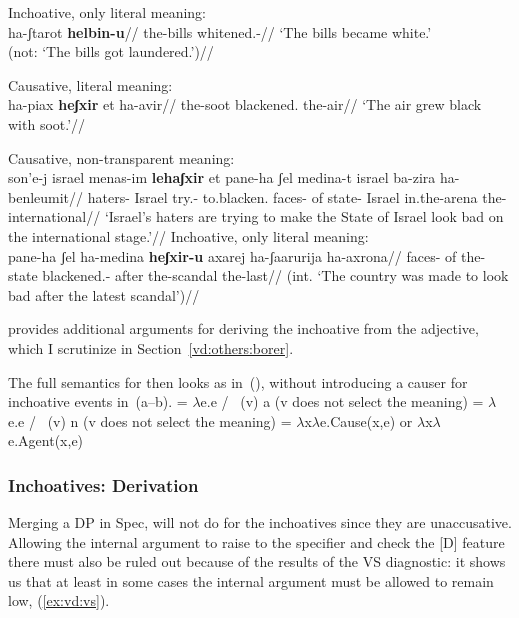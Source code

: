 	\a Inchoative, only literal meaning:\\
		\begingl
			\gla ha-ʃtarot \textbf{helbin-u}//
			\glb the-bills whitened.-//
			\glft `The bills became white.'\\
				(not: `The bills got laundered.')//
		\endgl
\xe

\pex
	\a Causative, literal meaning:\\
		\begingl
			\gla ha-piax \textbf{heʃxir} et ha-avir//
			\glb the-soot blackened.  the-air//
			\glft `The air grew black with soot.'//
		\endgl
	
	\a Causative, non-transparent meaning:\\
		\begingl
			\gla son'e-j israel menas-im \textbf{lehaʃxir} et pane-ha ʃel medina-t israel ba-zira ha-benleumit//
			\glb haters- Israel try.- to.blacken.  faces- of state- Israel in.the-arena the-international//
			\glft `Israel's haters are trying to make the State of Israel look bad on the international stage.'//
		\endgl
	\a Inchoative, only literal meaning:\\
		\begingl
			\gla{}pane-ha ʃel ha-medina \textbf{heʃxir-u} axarej ha-ʃaarurija ha-axrona//
			\glb faces- of the-state blackened.- after the-scandal the-last//
			\glft (int. `The country was made to look bad after the latest scandal')//
		\endgl
\xe


\cite{borer91} provides additional arguments for deriving the inchoative from the adjective, which I scrutinize in Section~\ref{vd:others:borer}.

The full semantics for {\vd} then looks as in~(\nextx), without introducing a causer for inchoative events in~(\nextx a--b).
\pex\label{ex:vd:sem-full}
	\a \denote{\vd} = $\lambda$e.e / \trace~(v) a \hfill (v does not select the meaning)
	\a \denote{\vd} = $\lambda$e.e / \trace~(v) n \hfill (v does not select the meaning)
	\a \denote{\vd} = $\lambda$x$\lambda$e.Cause(x,e) or $\lambda$x$\lambda$e.Agent(x,e)
\xe

		\subsubsection{Inchoatives: Derivation}
Merging a DP in Spec,{\vd} will not do for the inchoatives since they are unaccusative. Allowing the internal argument to raise to the specifier and check the [D] feature there must also be ruled out because of the results of the VS diagnostic: it shows us that at least in some cases the internal argument must be allowed to remain low, (\ref{ex:vd:vs}).

